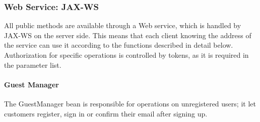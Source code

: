 \subsubsection{Web Service: JAX-WS} %
\label{ssub:web_service_jax_ws}
All public methods are available through a Web service, which is handled by JAX-WS on the server side. This means that each client knowing the address of the service can use it according to the functions described in detail below. Authorization for specific operations is controlled by tokens, as it is required in the parameter list.

\newpage
\paragraph{Guest Manager} %
\label{par:guest_manager}
The GuestManager bean is responsible for operations on unregistered users; it let customers register, sign in or confirm their email after signing up.
\begin{table}[h!]
\centering
{}
\end{table}

